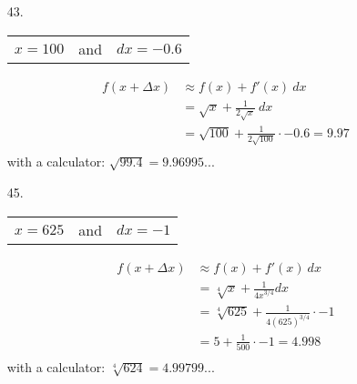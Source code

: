 \documentclass[12pt]{article}
\begin{document}
    \begin{enumerate}
        \item[43.] 
            \begin{tabular}[bc]{ccc}
            $x = 100$ & and & $dx = -0.6$\\
            \end{tabular}
            \begin{align*}
            f(x + \Delta{x}) &\approx f(x) + f'(x)~dx \\
            &= \sqrt{x} + \frac{1}{2\sqrt{x}}~dx\\
            &= \sqrt{100} + \frac{1}{2\sqrt{100}}\cdot-0.6 = 9.97\\
            \end{align*}
	with a calculator: $\sqrt{99.4} = 9.96995... $


        \item[45.] 
            \begin{tabular}[bc]{ccc}
            $x = 625$ & and & $dx = -1$\\
            \end{tabular}
            \begin{align*}
            f(x + \Delta{x}) &\approx f(x) + f'(x)~dx \\
            &= \sqrt[4]{x} + \frac{1}{4x^{3/4}}dx\\
            &= \sqrt[4]{625} + \frac{1}{4(625)^{3/4}}\cdot-1\\
            &= 5 + \frac{1}{500}\cdot-1 = 4.998\\
            \end{align*}
	with a calculator: $\sqrt[4]{624} = 4.99799... $
    \end{enumerate}



\end{document}
